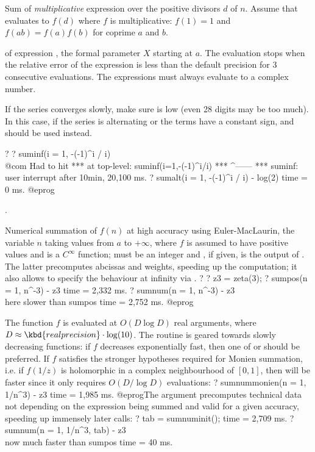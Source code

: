\label{se:sumdivmult}
Sum of \emph{multiplicative} expression  over the positive
divisors $d$ of $n$. Assume that  evaluates to $f(d)$
where $f$ is multiplicative: $f(1) = 1$ and $f(ab) = f(a)f(b)$ for coprime
$a$ and $b$.

\label{se:suminf}
 of expression
, the formal parameter $X$ starting at $a$. The evaluation stops
when the relative error of the expression is less than the default precision
for 3 consecutive evaluations. The expressions must always evaluate to a
complex number.

If the series converges slowly, make sure  is low (even 28
digits may be too much). In this case, if the series is alternating or the
terms have a constant sign,  and  should be used
instead.

\bprog
? 
? suminf(i = 1, -(-1)^i / i)   \\@com Had to hit 
  ***   at top-level: suminf(i=1,-(-1)^i/i)
  ***                                ^------
  *** suminf: user interrupt after 10min, 20,100 ms.
? sumalt(i = 1, -(-1)^i / i) - log(2)
time = 0 ms.
@eprog

.

\label{se:sumnum}
Numerical summation of $f(n)$ at high accuracy using Euler-MacLaurin,
the variable $n$ taking values from $a$ to $+\infty$, where $f$ is assumed to
have positive values and is a $C^\infty$ function;  must be an integer
and , if given, is the output of . The latter
precomputes abcissas and weights, speeding up the computation; it also allows
to specify the behaviour at infinity via .
\bprog
? 
? z3 = zeta(3);
? sumpos(n = 1, n^-3) - z3
time = 2,332 ms.
? sumnum(n = 1, n^-3) - z3 \\ here slower than sumpos
time = 2,752 ms.
@eprog

The function $f$ is evaluated at $O(D \log D)$ real arguments,
where $D \approx \kbd{realprecision} \cdot \log(10)$. The routine is geared
towards slowly decreasing functions: if $f$ decreases exponentially fast,
then one of  or  should be preferred.
If $f$ satisfies the stronger hypotheses required for Monien summation,
i.e. if $f(1/z)$ is holomorphic in a complex neighbourhood of $[0,1]$,
then  will be faster since it only requires $O(D/\log D)$
evaluations:
\bprog
? sumnummonien(n = 1, 1/n^3) - z3
time = 1,985 ms.
@eprog\noindent The  argument precomputes technical data
not depending on the expression being summed and valid for a given accuracy,
speeding up immensely later calls:
\bprog
? tab = sumnuminit();
time = 2,709 ms.
? sumnum(n = 1, 1/n^3, tab) - z3 \\ now much faster than sumpos
time = 40 ms.

